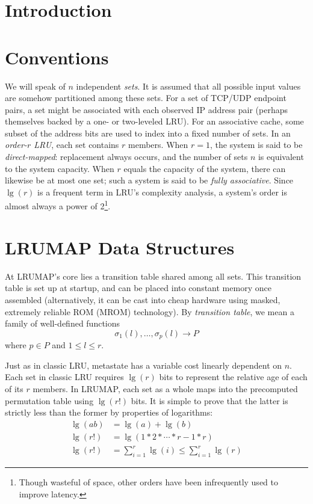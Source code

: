 \documentclass[letterpaper,10pt]{article}
\begin{document}
\begin{multicols}{2}
\section{Introduction}
\cite{varghese}
\cite{xu}

\section{Conventions}
We will speak of $n$ independent \textit{sets}. It is assumed that all possible
input values are somehow partitioned among these sets. For a set of TCP/UDP
endpoint pairs, a set might be associated with each observed IP address pair
(perhaps themselves backed by a one- or two-leveled LRU). For an associative
cache, some subset of the address bits are used to index into a fixed number of
sets. In an \textit{order-$r$ LRU}, each set contains $r$ members. When $r=1$,
the system is said to be \textit{direct-mapped}: replacement always occurs, and
the number of sets $n$ is equivalent to the system capacity. When $r$ equals
the capacity of the system, there can likewise be at most one set; such a system
is said to be \textit{fully associative}. Since $\lg{(r)}$ is a frequent term in
LRU's complexity analysis, a system's order is almost always a power of 2\footnote{Though
wasteful of space, other orders have been infrequently used to improve latency\cite{intelcpuid}.}.
\section{LRUMAP Data Structures}
At LRUMAP's core lies a transition table shared among all sets. This transition
table is set up at startup, and can be placed into constant memory once
assembled (alternatively, it can be cast into cheap hardware using masked,
extremely reliable ROM (MROM) technology\cite{ice}). By \textit{transition table},
we mean a family of well-defined functions \begin{equation*}
\sigma_{1}(l),\dotsc,\sigma_{p}(l)\longrightarrow{P}
\end{equation*} where $p\in{P}$ and $1\le{l}\le{r}$.

Just as in classic LRU, metastate has a variable cost linearly dependent on $n$.
Each set in classic LRU requires $\lg{(r)}$ bits to represent the relative age
of each of its $r$ members. In LRUMAP, each set as a whole maps into the
precomputed permutation table using $\lg{(r!)}$ bits. It is simple to prove that
the latter is strictly less than the former by properties of logarithms:
\begin{align*}
\lg{(ab)} &= \lg{(a)} + \lg{(b)} \\
\lg{(r!)} &= \lg{(1*2*\dotsb*r-1*r)} \\
\lg{(r!)} &= \sum_{i=1}^{r}{\lg{(i)}} \le \sum_{i=1}^{r}{\lg{(r)}}
\end{align*}

\end{multicols}
\end{document}
